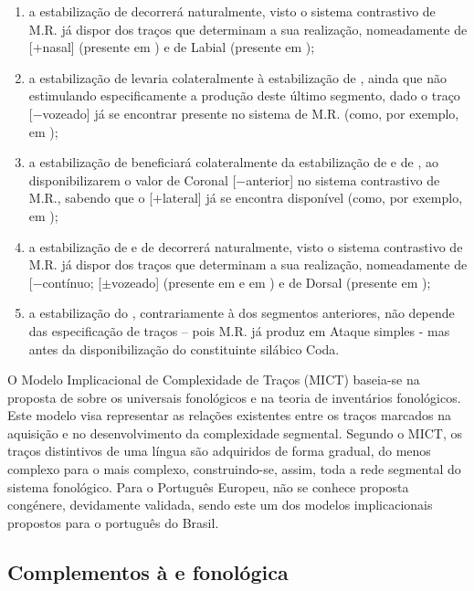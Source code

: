 \documentclass[output=paper]{LSP/langsci}
\begin{document}
\begin{enumerate}
\item a estabilização de  decorrerá naturalmente, visto o sistema contrastivo de M.R. já dispor dos traços que determinam a sua realização, nomeadamente de [$+$nasal] (presente em \ipa{[n]}) e de Labial (presente em \ipa{[b]});

\item  a estabilização de  levaria colateralmente à estabilização de , ainda que não estimulando especificamente a produção deste último segmento, dado o traço [$-$vozeado] já se encontrar presente no sistema de M.R. (como, por exemplo, em \ipa{[b]});

\item a estabilização de  beneficiará colateralmente da estabilização de  e de , ao disponibilizarem o valor de Coronal [$-$anterior] no sistema  contrastivo de M.R., sabendo que o [$+$lateral] já se encontra disponível (como, por exemplo, em \ipa{[l]});

\item a estabilização de  e de  decorrerá naturalmente, visto o sistema contrastivo de M.R. já dispor dos traços que determinam a sua realização, nomeadamente de [$-$contínuo; [$\pm$vozeado] (presente em \ipa{[t]} e em \ipa{[b]}) e de Dorsal (presente em );

\item a estabilização do , contrariamente à dos segmentos anteriores, não depende das especificação de traços – pois M.R. já produz  em Ataque simples - mas antes da disponibilização do constituinte silábico Coda.
\end{enumerate}

O Modelo Implicacional de Complexidade de Traços (MICT) \citep{mota1996} baseia-se na proposta de \citet{clements1999} sobre os universais fonológicos e na teoria de inventários fonológicos. Este modelo visa representar as relações existentes entre os traços marcados na aquisição e no desenvolvimento da complexidade segmental. Segundo o MICT, os traços distintivos de uma língua são adquiridos de forma gradual, do menos complexo para o mais complexo, construindo-se, assim, toda a rede segmental do sistema fonológico. Para o Português Europeu, não se conhece proposta congénere, devidamente validada, sendo este um dos modelos implicacionais propostos para o português do Brasil.

\subsection{Complementos à  e fonológica}
\label{subsec:lousada_complementos}
\end{document}
